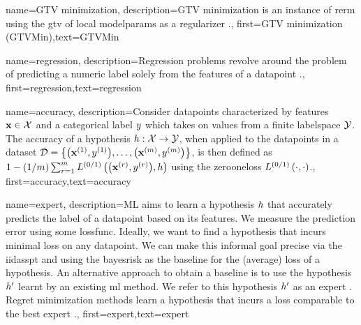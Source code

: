 {name={GTV minimization},
	description={GTV minimization is an instance of \gls{rerm} 
		using the \gls{gtv} of local \gls{modelparams} as a \gls{regularizer} \cite{ClusteredFLTVMinTSP}.},
	first={GTV minimization (GTVMin)},text={GTVMin} 
}

{name={regression},
	description={Regression problems revolve around the problem of 
		predicting a numeric \gls{label} solely from the \gls{feature}s of a \gls{datapoint} \cite[Ch. 2]{MLBasics}.},
	first={regression},text={regression} 
}

{name={accuracy},
	description={Consider \gls{datapoint}s characterized by \gls{feature}s ${\bf x} \in \mathcal{X}$ and 
		a categorical label $y$ which takes on values from a finite \gls{labelspace} $\mathcal{Y}$. The 
		accuracy of a \gls{hypothesis} $h: \mathcal{X} \rightarrow \mathcal{Y}$, when applied 
		to the \gls{datapoint}s in a \gls{dataset} $\mathcal{D} = \big\{ \big({\bf x}^{(1)}, y^{(1)} \big), \ldots, \big({\bf x}^{(m)},y^{(m)}\big) \big\}$, 
		is then defined as $1 - (1/m)\sum_{r=1}^{m} L^{(0/1)}\left(\big({\bf x}^{(r)},y^{(r)}\big),h \right)$ using the \gls{zerooneloss} $L^{(0/1)}\left(\cdot,\cdot \right)$.},
	first={accuracy},text={accuracy} 
}





{name={expert},
	description={ML aims to learn a \gls{hypothesis} $h$ that accurately predicts the \gls{label} 
		of a \gls{datapoint} based on its \gls{feature}s. We measure the prediction error using 
		some \gls{lossfunc}. Ideally, we want to find a \gls{hypothesis} that incurs minimal \gls{loss} 
		on any \gls{datapoint}. We can make this informal goal precise via the \gls{iidasspt} 
		and using the \gls{bayesrisk} as the \gls{baseline} for the (average) \gls{loss} of a \gls{hypothesis}. 
		An alternative approach to obtain a \gls{baseline} is to use the \gls{hypothesis} $h'$ learnt 
		by an existing \gls{ml} method. We refer to this \gls{hypothesis} $h'$ as an expert \cite{PredictionLearningGames}. Regret minimization methods learn a \gls{hypothesis}
		that incurs a \gls{loss} comparable to the best expert \cite{PredictionLearningGames,HazanOCO}.},
	first={expert},text={expert} 
}

